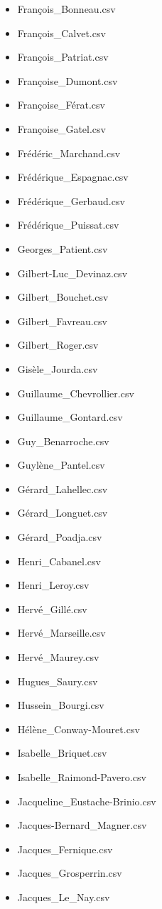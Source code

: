 \documentclass[a4paper,12pt,twoside]{book}
\begin{document}
\begin{itemize}
  \item François\_Bonneau.csv
  \item François\_Calvet.csv
  \item François\_Patriat.csv
  \item Françoise\_Dumont.csv
  \item Françoise\_Férat.csv
  \item Françoise\_Gatel.csv
  \item Frédéric\_Marchand.csv
  \item Frédérique\_Espagnac.csv
  \item Frédérique\_Gerbaud.csv
  \item Frédérique\_Puissat.csv
  \item Georges\_Patient.csv
  \item Gilbert-Luc\_Devinaz.csv
  \item Gilbert\_Bouchet.csv
  \item Gilbert\_Favreau.csv
  \item Gilbert\_Roger.csv
  \item Gisèle\_Jourda.csv
  \item Guillaume\_Chevrollier.csv
  \item Guillaume\_Gontard.csv
  \item Guy\_Benarroche.csv
  \item Guylène\_Pantel.csv
  \item Gérard\_Lahellec.csv
  \item Gérard\_Longuet.csv
  \item Gérard\_Poadja.csv
  \item Henri\_Cabanel.csv
  \item Henri\_Leroy.csv
  \item Hervé\_Gillé.csv
  \item Hervé\_Marseille.csv
  \item Hervé\_Maurey.csv
  \item Hugues\_Saury.csv
  \item Hussein\_Bourgi.csv
  \item Hélène\_Conway-Mouret.csv
  \item Isabelle\_Briquet.csv
  \item Isabelle\_Raimond-Pavero.csv
  \item Jacqueline\_Eustache-Brinio.csv
  \item Jacques-Bernard\_Magner.csv
  \item Jacques\_Fernique.csv
  \item Jacques\_Grosperrin.csv
  \item Jacques\_Le\_Nay.csv

\end{itemize}
\end{document}
